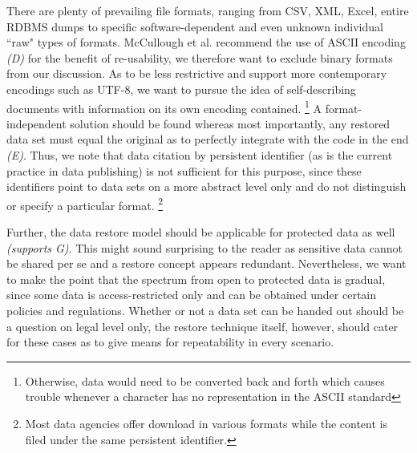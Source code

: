 \documentclass{acm_proc_article-sp}
\begin{document}
There are plenty of prevailing file formats, ranging from CSV, XML, Excel, entire RDBMS dumps to specific software-dependent and even unknown individual ``raw" types of formats.
McCullough et al. recommend the use of ASCII encoding \textit{(D)} for the benefit of re-usability, we therefore want to exclude binary formats from our discussion.
As to be less restrictive and support more contemporary encodings such as UTF-8, we want to pursue the idea of self-describing documents with information on its own encoding contained.
\footnote{Otherwise, data would need to be converted back and forth which causes trouble whenever a character has no representation in the ASCII standard}
A format-independent solution should be found whereas most importantly, any restored data set must equal the original as to perfectly integrate with the code in the end \textit{(E)}. 
Thus, we note that data citation by persistent identifier (as is the current practice in data publishing) is not sufficient for this purpose, since these identifiers point to data sets on a more abstract level only and do not distinguish or specify a particular format.
\footnote{Most data agencies offer download in various formats while the content is filed under the same persistent identifier.}

  
Further, the data restore model should be applicable for protected data as well \textit{(supports G)}.
This might sound surprising to the reader as sensitive data cannot be shared per se and a restore concept appears redundant.
Nevertheless, we want to make the point that the spectrum from open to protected data is gradual, since some data is access-restricted only and can be obtained under certain policies and regulations.
Whether or not a data set can be handed out should be a question on legal level only, the restore technique itself, however, should cater for these cases as to give means for repeatability in every scenario.
\end{document}
